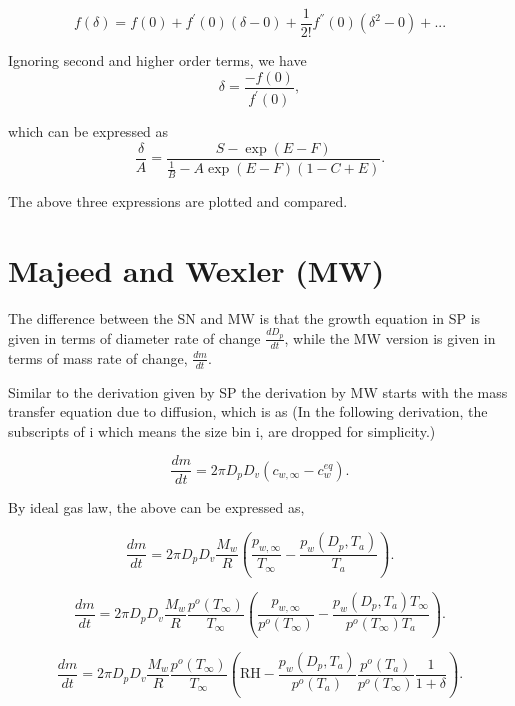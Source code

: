 \documentclass[12pt]{amsart}
\begin{document}
\begin{equation}
f(\delta)=f(0)+f^{'}(0)(\delta-0)+\frac{1}{2!}f^{''}(0)(\delta^{2}-0)+...
\end{equation}

Ignoring second and higher order terms, we have
\begin{equation}
\delta=\frac{-f(0)}{f^{'}(0)},
\end{equation}

which can be expressed as
\begin{equation}
\frac{\delta}{A}=\frac{S-\exp(E-F)}{\frac{1}{B}-A \exp(E-F) (1-C+E)}.
\end{equation}

The above three expressions are plotted and compared.

\section{Majeed and Wexler (MW) }

The difference between the SN and MW is that the growth equation in SP is given in terms of diameter rate of change $\frac{d D_{p}}{dt}$, while the MW version is given in terms of mass rate of change, $\frac{dm}{dt}$.

Similar to the derivation given by SP the derivation by MW starts with the mass transfer equation due to diffusion, which is as  (In the following derivation, the subscripts of i which means the size bin i,  are dropped for simplicity.)

\begin{equation}\label{eqn:18}
\frac{dm}{dt}=2 \pi D_{p} D_{v} (c_{w, \infty} - c_{w}^{eq}).  
\end{equation}

By ideal gas law, the above can be expressed as,

\begin{equation}\label{eqn:19}
\frac{dm}{dt}=2 \pi D_{p} D_{v} \frac{M_{w}}{R} (\frac{p_{w, \infty}}{T_{\infty}} - \frac{p_{w}(D_{p}, T_{a})}{T_{a}}).
\end{equation}


\begin{equation}\label{eqn:20}
\frac{dm}{dt}=2 \pi D_{p} D_{v} \frac{M_{w}}{R}  \frac{p^{o}(T_{\infty})} {T_{\infty}} (\frac{p_{w, \infty}}{p^{o}(T_{\infty})} - \frac{p_{w}(D_{p}, T_{a}) T_{\infty}}{p^{o}(T_{\infty}) T_{a}}).
\end{equation}


\begin{equation}\label{eqn:MWgrowth}
\frac{dm}{dt}=2 \pi D_{p} D_{v}  \frac{M_{w}}{R} \frac{p^{o}(T_{\infty})} {T_{\infty}} (\textrm{RH} - \frac{p_{w}(D_{p}, T_{a})}{p^{o}(T_{a})} \frac{p^{o}(T_{a})}{p^{o}(T_{\infty})}\frac{1}{1+\delta}).
\end{equation}
\end{document}
